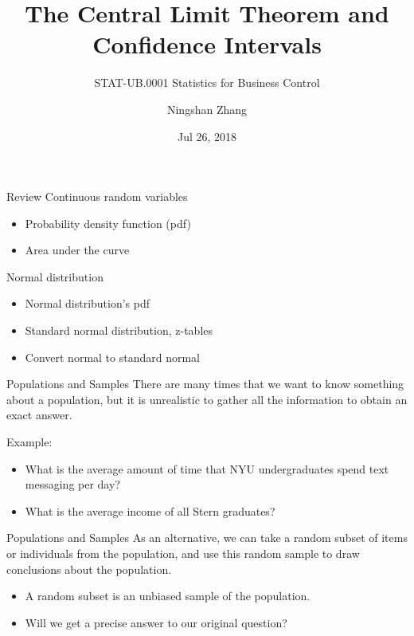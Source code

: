 \documentclass{beamer}
\title{The Central Limit Theorem and Confidence Intervals}
\subtitle{STAT-UB.0001 Statistics for Business Control}
\author{Ningshan Zhang}
\institute[New York University] %
{
  IOMS Department\\
  nzhang@stern.nyu.edu
  \let\thefootnote\relax\footnotetext{\tiny{*  Office Hours: Wed \& Fri 10:00 - 11:30 AM, KMC 8-174}}
}
\date{Jul 26, 2018}
\begin{document}
\begin{frame}
  \titlepage
\end{frame}



\begin{frame}{Review}
Continuous random variables
\begin{itemize}
\item Probability density function (pdf)
\item Area under the curve
\end{itemize}
Normal distribution
\begin{itemize}
\item Normal distribution's pdf
\item Standard normal distribution, z-tables
\item Convert normal to standard normal
\end{itemize}
\end{frame}


\begin{frame}{Populations and Samples}
There are many times that we want to know something about a population, but it is unrealistic to gather all the information to obtain an exact answer.

Example:
\begin{itemize}
\item What is the average amount of time that NYU undergraduates spend text messaging per day?
\item What is the average income of all Stern graduates?
\end{itemize}
\end{frame}

\begin{frame}{Populations and Samples}
As an alternative, we can take a random subset of items or individuals from the population, 
and use this random sample to draw conclusions about the population.

\begin{itemize}
\item A random subset is an unbiased sample of the population.
\item Will we get a precise answer to our original question?
\end{itemize}
\end{frame}
\end{document}
